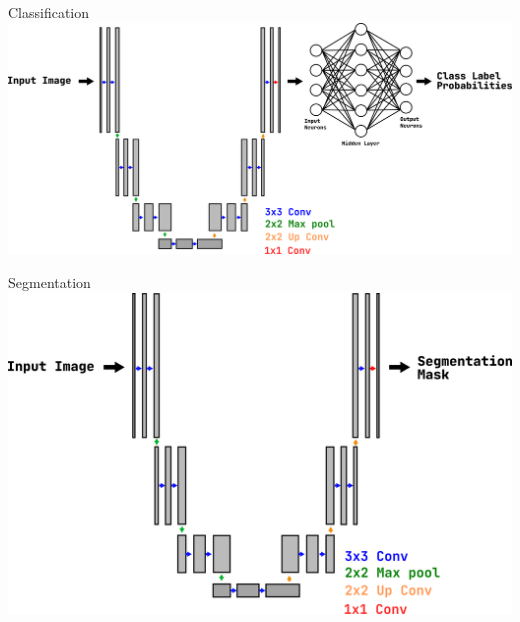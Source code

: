 
\begin{frame}{Classification}
   \centering
   \includegraphics[width=0.8\linewidth]{images/classification.png}
\end{frame}

\begin{frame}{Segmentation}
   \centering
   \includegraphics[width=0.8\linewidth]{images/segmentation.png}
\end{frame}




